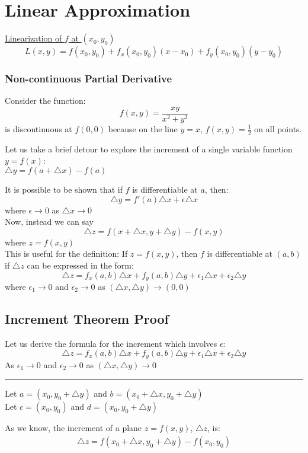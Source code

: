 \documentclass[12pt]{article}
\begin{document}
\section{Linear Approximation}
\underline{Linearization of \(f\) at \((x_0,y_0)\) }
\[
	L(x,y) = f(x_0,y_0) + f_x(x_0,y_0)(x-x_0) + f_y(x_0,y_0)(y-y_0)
\]
\subsubsection{Non-continuous Partial Derivative}
Consider the function:
\[
	f(x,y) = \frac{xy}{x^2+y^2}
\]
is discontinuous at \(f(0,0)\) because on the line \(y=x\), \(f(x,y) = \frac{1}{2}\) on all points.

Let us take a brief detour to explore the increment of a single variable function \(y=f(x)\):\\
\(\triangle y = f(a+ \triangle x)-f(a)\)

It is possible to be shown that if \(f\) is differentiable at \(a\), then: 
\[
	\triangle y = f'(a)\triangle x + \epsilon \triangle x
\]
where \(\epsilon \rightarrow 0\) as \(\triangle x \rightarrow 0\)\\
Now, instead we can say \[
	\triangle z = f(x+\triangle x, y + \triangle y) - f(x,y)
\]
where \(z=f(x,y)\)\\
This is useful for the definition:
If \(z=f(x,y)\), then \(f\) is differentiable at \((a,b)\) if \(\triangle z\) can be expressed in the form: 
\[
	\triangle z= f_x(a,b)\triangle x + f_y(a,b)\triangle y + \epsilon_1 \triangle x + \epsilon_2\triangle y
\]
where \(\epsilon_1 \rightarrow 0\) and \(\epsilon_2 \rightarrow 0\) as \((\triangle x, \triangle y) \rightarrow (0,0)\)

\subsection{Increment Theorem Proof}
Let us derive the formula for the increment which involves \(\epsilon\):
\[
	\triangle z = f_x(a,b)\triangle x + f_y(a,b)\triangle y + \epsilon_1\triangle x + \epsilon_2\triangle y
\]
As \(\epsilon_1 \to 0\) and \(\epsilon_2 \to 0\) as \((\triangle x,\triangle y) \to 0\)

\noindent \rule{5in}{0.1mm}

\noindent Let \(a = (x_0,y_0 + \triangle y)\) and \(b = (x_0 + \triangle x, y_0 + \triangle y)\)\\
Let \(c = (x_0,y_0)\) and \(d = (x_0, y_0 + \triangle y)\)

As we know, the increment of a plane \(z=f(x,y)\), \(\triangle z\), is:
\begin{align}
	\triangle z = f(x_0+\triangle x, y_0 + \triangle y) - f(x_0,y_0)
\end{align}
\end{document}
